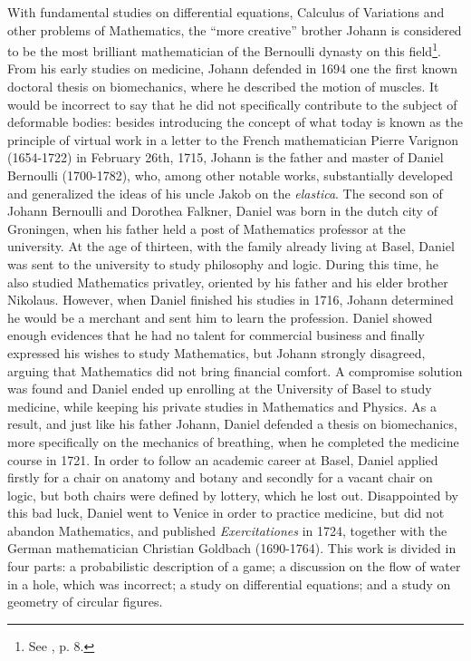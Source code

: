 With fundamental studies on differential equations, Calculus of Variations and other problems of Mathematics, the ``more creative'' brother Johann is considered to be the most brilliant mathematician of the Bernoulli dynasty on this field\footnote{See \cite{maugin_2014}, p. 8.}. From his early studies on medicine, Johann defended in 1694 one the first known doctoral thesis on biomechanics, where he described the motion of muscles. It would be incorrect to say that he did not specifically contribute to the subject of deformable bodies: besides introducing the concept of  what today is known as the principle of virtual work in a letter to the French mathematician Pierre Varignon (1654-1722) in February 26th, 1715, Johann is the father and master of Daniel Bernoulli (1700-1782), who, among other notable works, substantially developed and generalized the ideas of his uncle Jakob on the \emph{elastica}. The second son of Johann Bernoulli and Dorothea Falkner, Daniel was born in the dutch city of Groningen, when his father held a post of Mathematics professor at the university. At the age of thirteen, with the family already living at Basel, Daniel was sent to the university to study philosophy and logic. During this time, he also studied Mathematics privatley, oriented by his father and his elder brother Nikolaus. However, when Daniel finished his studies in 1716, Johann determined he would be a merchant and sent him to learn the profession. Daniel showed enough evidences that he had no talent for commercial business and finally expressed his wishes to study Mathematics, but Johann strongly disagreed, arguing that Mathematics did not bring financial comfort. A compromise solution was found and Daniel ended up enrolling at the University of Basel to study medicine, while keeping his private studies in Mathematics and Physics. As a result, and just like his father Johann, Daniel defended a thesis on biomechanics, more specifically on the mechanics of breathing, when he completed the medicine course in 1721. In order to follow an academic career at Basel, Daniel applied firstly for a chair on anatomy and botany and secondly for a vacant chair on logic, but both chairs were defined by lottery, which he lost out. Disappointed by this bad luck, Daniel went to Venice in order to practice medicine, but did not abandon Mathematics, and published \emph{Exercitationes} in 1724, together with the German mathematician Christian Goldbach (1690-1764). This work is divided in four parts: a probabilistic description of a game; a discussion on the flow of water in a hole, which was incorrect; a study on differential equations; and a study on geometry of circular figures.           



